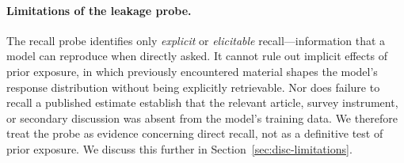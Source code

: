 \documentclass[12pt]{article}
\begin{document}
\paragraph{Limitations of the leakage probe.} The recall probe identifies only \emph{explicit} or \emph{elicitable}
recall---information that a model can reproduce when directly asked. It
cannot rule out implicit effects of prior exposure, in which previously
encountered material shapes the model's response distribution without
being explicitly retrievable. Nor does failure to recall a published
estimate establish that the relevant article, survey instrument, or
secondary discussion was absent from the model's training data. We
therefore treat the probe as evidence concerning direct recall, not as a
definitive test of prior exposure. We discuss this further in Section~\ref{sec:disc-limitations}.

\newpage
\printendnotes
\end{document}
